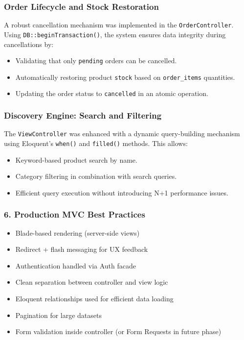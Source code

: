 \documentclass[12pt,a4paper]{article}
\begin{document}
\subsubsection{Order Lifecycle and Stock Restoration}

A robust cancellation mechanism was implemented in the \texttt{OrderController}. Using \texttt{DB::beginTransaction()}, the system ensures data integrity during cancellations by:

\begin{itemize}
    \item Validating that only \texttt{pending} orders can be cancelled.
    \item Automatically restoring product \texttt{stock} based on \texttt{order\_items} quantities.
    \item Updating the order status to \texttt{cancelled} in an atomic operation.
\end{itemize}

\subsubsection{Discovery Engine: Search and Filtering}

The \texttt{ViewController} was enhanced with a dynamic query-building mechanism using Eloquent’s \texttt{when()} and \texttt{filled()} methods. This allows:

\begin{itemize}
    \item Keyword-based product search by name.
    \item Category filtering in combination with search queries.
    \item Efficient query execution without introducing N+1 performance issues.
\end{itemize}


\subsubsection{6. Production MVC Best Practices}

\begin{itemize}[noitemsep]
    \item Blade-based rendering (server-side views)
    \item Redirect + flash messaging for UX feedback
    \item Authentication handled via Auth facade
    \item Clean separation between controller and view logic
    \item Eloquent relationships used for efficient data loading
    \item Pagination for large datasets
    \item Form validation inside controller (or Form Requests in future phase)
\end{itemize}
\end{document}

